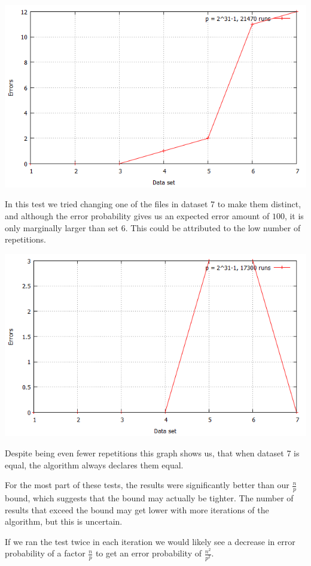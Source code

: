 \documentclass[article,a4paper,oneside]{article}
\newcommand{\+}[1]{\ensuremath{\boldsymbol{#1}}}
\begin{document}
\begin{center}
\includegraphics[scale=0.5]{fingerprint_johan.png}\\
\end{center}
In this test we tried changing one of the files in dataset 7 to make them distinct, and although the error probability gives us an expected error amount of $100$, it is only marginally larger than set 6. This could be attributed to the low number of repetitions.

\begin{center}
\includegraphics[scale=0.5]{fingerprint_bo.png}\\
\end{center}
Despite being even fewer repetitions this graph shows us, that when dataset 7 is equal, the algorithm always declares them equal.

For the most part of these tests, the results were significantly better than our $\frac{n}{p}$ bound, which suggests that the bound may actually be tighter. The number of results that exceed the bound may get lower with more iterations of the algorithm, but this is uncertain.

If we ran the test twice in each iteration we would likely see a decrease in error probability of a factor $\frac{n}{p}$ to get an error probability of $\frac{n^2}{p^2}$.
\end{document}
